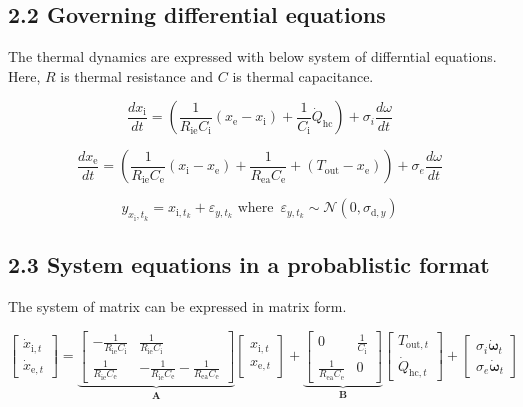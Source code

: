 \documentclass[
]{article}
\begin{document}
\hypertarget{governing-differential-equations}{%
\subsection{2.2 Governing differential
equations}\label{governing-differential-equations}}

The thermal dynamics are expressed with below system of differntial
equations. Here, \(R\) is thermal resistance and \(C\) is thermal
capacitance.

\[\frac{ dx_{\text{i}} }{dt} =\left( \frac{1}{R_{\text{ie}} C_{\text{i}}}(x_\text{e}-x_\text{i}) +\frac{1}{C_{\text{i}}} \dot{Q}_{\text{hc}} \right)+\sigma_i \frac{d\omega}{dt}\]

\[\frac{dx_{\text{e}}}{dt}=\left( \frac{1}{R_{\text{ie}} C_{\text{e}}}(x_\text{i}-x_\text{e})+ \frac{1}{R_{\text{ea}} C_{\text{e}}}+(T_{\text{out}}-x_\text{e})  \right)+\sigma_e \frac{d\omega}{dt}\]

\[y_{x_\text{i},t_k}=x_{\text{i},t_k}+\varepsilon_{y,t_k} \text{ where } \,\varepsilon_{y,t_k}\sim\mathcal{N}(0,\sigma_{\text{d},y})\]

\hypertarget{system-equations-in-a-probablistic-format}{%
\subsection{2.3 System equations in a probablistic
format}\label{system-equations-in-a-probablistic-format}}

The system of matrix can be expressed in matrix form.

\[\begin{bmatrix} 
\dot{x}_{\text{i},t}  \\ 
\dot{x}_{\text{e},t}  
\end{bmatrix}=
\underbrace{
\begin{bmatrix} 
-\frac{1}{R_\text{ie}C_\text{i}} & \frac{1}{R_\text{ie}C_\text{i}}  \\ 
\frac{1}{R_\text{ie}C_\text{e}} & -\frac{1}{R_\text{ie}C_\text{e}}-\frac{1}{R_\text{ea}C_\text{e}}  
\end{bmatrix} }_{\textbf{A}}
\begin{bmatrix} 
x_{\text{i},t}  \\ 
x_{\text{e},t}     
\end{bmatrix} +
\underbrace{\begin{bmatrix} 
0 & \frac{1}{C_\text{i}}  \\ 
\frac{1}{R_\text{ea}C_\text{e}} & 0  
\end{bmatrix} }_{\textbf{B}}
\begin{bmatrix} 
T_{\text{out},t}  \\ 
\dot{Q}_{\text{hc},t}   
\end{bmatrix}+
\begin{bmatrix} 
\sigma_{i}\dot{\boldsymbol{\omega}}_{t}  \\ 
\sigma_{e}\dot{\boldsymbol{\omega}}_{t}   
\end{bmatrix}\]
\end{document}
